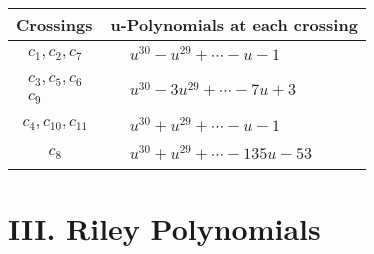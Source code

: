 \documentclass[1p]{elsarticle_modified}
\theoremstyle{definition}
\begin{document}
\begin{tabular}{m{50pt}|m{274pt}}
Crossings & \hspace{64pt}u-Polynomials at each crossing \\
\hline $$\begin{aligned}c_{1},c_{2},c_{7}\end{aligned}$$&$\begin{aligned}
&u^{30}- u^{29}+\cdots- u-1
\end{aligned}$\\
\hline $$\begin{aligned}c_{3},c_{5},c_{6}\\c_{9}\end{aligned}$$&$\begin{aligned}
&u^{30}-3 u^{29}+\cdots-7 u+3
\end{aligned}$\\
\hline $$\begin{aligned}c_{4},c_{10},c_{11}\end{aligned}$$&$\begin{aligned}
&u^{30}+u^{29}+\cdots- u-1
\end{aligned}$\\
\hline $$\begin{aligned}c_{8}\end{aligned}$$&$\begin{aligned}
&u^{30}+u^{29}+\cdots-135 u-53
\end{aligned}$\\
\hline
\end{tabular}\newpage\renewcommand{\arraystretch}{1}
\centering \section*{ III. Riley Polynomials}
\end{document}
